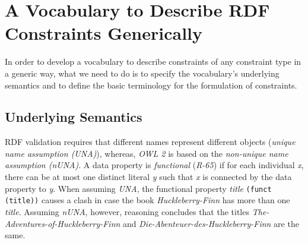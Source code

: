 \documentclass[a4paper,fontsize=11pt]{scrartcl}
\newcommand{\ms}[1]{\texttt{#1}}
\begin{document}


\section{A Vocabulary to Describe RDF Constraints Generically} 
\label{sec:vocabulary}

In order to develop a vocabulary to describe constraints of any constraint type in a generic way, what we need to do is to specify the vocabulary's underlying semantics and to define the basic terminology for the formulation of constraints.

\subsection{Underlying Semantics}

RDF validation requires that different names represent different objects (\emph{unique name assumption (UNA)}), whereas,
\emph{OWL 2} is based on the {\em non-unique name assumption (nUNA)}.  
A data property is \emph{functional} (\emph{R-65}) if for each individual \emph{x}, there can be at most one distinct literal \emph{y} such that \emph{x} is connected by the data property to \emph{y}. 
When assuming \emph{UNA}, the functional property {\em title} {\small\ms{(funct (title))}} causes a clash
in case the book {\em Huckleberry-Finn} has more than one \emph{title}.
Assuming \emph{nUNA}, however, reasoning concludes that the titles {\em The-Adventures-of-Huckleberry-Finn} and {\em Die-Abenteuer-des-Huckleberry-Finn} are the same. 
\end{document}
